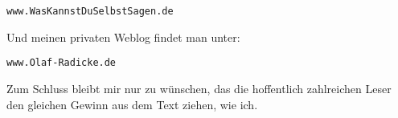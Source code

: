 \begin{center}
\texttt{www.WasKannstDuSelbstSagen.de}
\end{center}

Und meinen privaten Weblog findet man unter:

\begin{center}
\texttt{www.Olaf-Radicke.de}
\end{center}

Zum Schluss bleibt mir nur zu wünschen, das die hoffentlich zahlreichen Leser
den gleichen Gewinn aus dem Text ziehen, wie ich.



